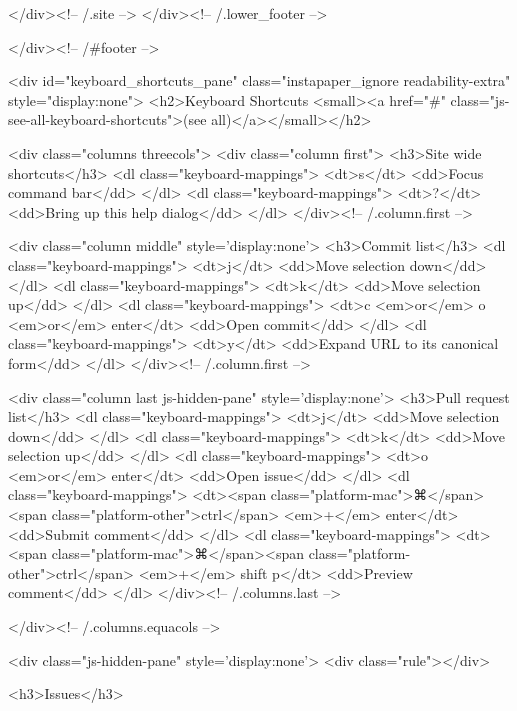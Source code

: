   </div><!-- /.site -->
</div><!-- /.lower_footer -->


      </div><!-- /#footer -->

    

<div id="keyboard_shortcuts_pane" class="instapaper_ignore readability-extra" style="display:none">
  <h2>Keyboard Shortcuts <small><a href="#" class="js-see-all-keyboard-shortcuts">(see all)</a></small></h2>

  <div class="columns threecols">
    <div class="column first">
      <h3>Site wide shortcuts</h3>
      <dl class="keyboard-mappings">
        <dt>s</dt>
        <dd>Focus command bar</dd>
      </dl>
      <dl class="keyboard-mappings">
        <dt>?</dt>
        <dd>Bring up this help dialog</dd>
      </dl>
    </div><!-- /.column.first -->

    <div class="column middle" style='display:none'>
      <h3>Commit list</h3>
      <dl class="keyboard-mappings">
        <dt>j</dt>
        <dd>Move selection down</dd>
      </dl>
      <dl class="keyboard-mappings">
        <dt>k</dt>
        <dd>Move selection up</dd>
      </dl>
      <dl class="keyboard-mappings">
        <dt>c <em>or</em> o <em>or</em> enter</dt>
        <dd>Open commit</dd>
      </dl>
      <dl class="keyboard-mappings">
        <dt>y</dt>
        <dd>Expand URL to its canonical form</dd>
      </dl>
    </div><!-- /.column.first -->

    <div class="column last js-hidden-pane" style='display:none'>
      <h3>Pull request list</h3>
      <dl class="keyboard-mappings">
        <dt>j</dt>
        <dd>Move selection down</dd>
      </dl>
      <dl class="keyboard-mappings">
        <dt>k</dt>
        <dd>Move selection up</dd>
      </dl>
      <dl class="keyboard-mappings">
        <dt>o <em>or</em> enter</dt>
        <dd>Open issue</dd>
      </dl>
      <dl class="keyboard-mappings">
        <dt><span class="platform-mac">⌘</span><span class="platform-other">ctrl</span> <em>+</em> enter</dt>
        <dd>Submit comment</dd>
      </dl>
      <dl class="keyboard-mappings">
        <dt><span class="platform-mac">⌘</span><span class="platform-other">ctrl</span> <em>+</em> shift p</dt>
        <dd>Preview comment</dd>
      </dl>
    </div><!-- /.columns.last -->

  </div><!-- /.columns.equacols -->

  <div class="js-hidden-pane" style='display:none'>
    <div class="rule"></div>

    <h3>Issues</h3>

